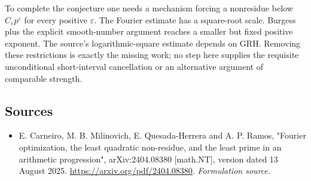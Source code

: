 \documentclass[11pt]{article}
\begin{document}
To complete the conjecture one needs a mechanism forcing a nonresidue below $C_\varepsilon p^\varepsilon$ for every positive $\varepsilon$. The Fourier estimate has a square-root scale. Burgess plus the explicit smooth-number argument reaches a smaller but fixed positive exponent. The source's logarithmic-square estimate depends on GRH. Removing these restrictions is exactly the missing work; no step here supplies the requisite unconditional short-interval cancellation or an alternative argument of comparable strength.

\subsection{Sources}
\begin{itemize}
\item[S1]E. Carneiro, M. B. Milinovich, E. Quesada-Herrera and A. P. Ramos, "Fourier optimization, the least quadratic non-residue, and the least prime in an arithmetic progression", arXiv:2404.08380 [math.NT], version dated 13 August 2025.
\url{https://arxiv.org/pdf/2404.08380}.
\textit{Formulation source.}
\end{itemize}
\end{document}
